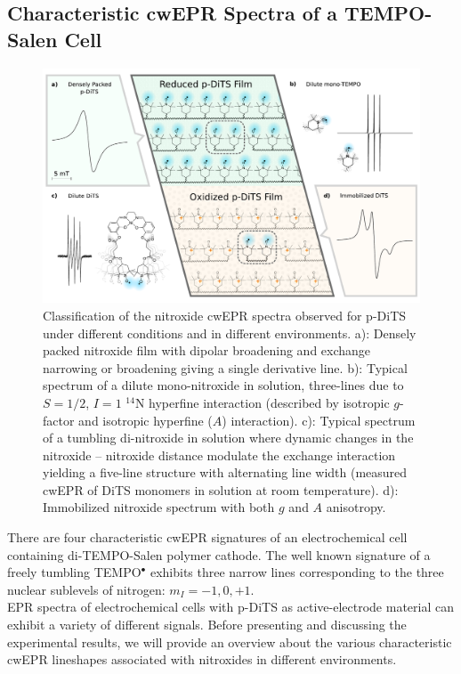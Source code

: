 \subsection{Characteristic cwEPR Spectra of a TEMPO-Salen Cell}

\begin{figure}[H]
\center
	\includegraphics[width=1\textwidth]{./operando_epr/figures/Cartoon_ALL.pdf}
	\caption{Classification of the nitroxide cwEPR spectra observed for p-DiTS under different conditions and in different environments. a): Densely packed nitroxide film with dipolar broadening and exchange narrowing or broadening giving a single derivative line. b): Typical spectrum of a dilute mono-nitroxide in solution, three-lines due to $S=1/2$, $I=1$ $^{14}$N hyperfine interaction (described by isotropic $g$-factor and isotropic hyperfine ($A$) interaction). c): Typical spectrum of a tumbling di-nitroxide in solution where dynamic changes in the nitroxide -- nitroxide distance modulate the exchange interaction yielding a five-line structure with alternating line width (measured cwEPR of DiTS monomers in solution at room temperature). d): Immobilized nitroxide spectrum with both $g$ and $A$ anisotropy.}
	\label{fig:cartoon_spectra_dts}
\end{figure}

There are four characteristic cwEPR signatures of an electrochemical cell containing di-TEMPO-Salen polymer cathode. The well known signature of a freely tumbling TEMPO$^{\bullet}$ exhibits three narrow lines corresponding to the three nuclear sublevels of nitrogen: $m_I=-1,0,+1$.\\

EPR spectra of electrochemical cells with p-DiTS as active-electrode material can exhibit a variety of different signals. Before presenting and discussing the experimental results, we will provide an overview about the various characteristic cwEPR lineshapes associated with nitroxides in different environments.
\par

